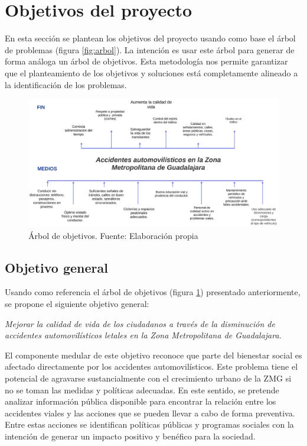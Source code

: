 \documentclass{article}
\newcommand{\forceindent}{\leavevmode{\parindent=1em\indent}}
\begin{document}
\newpage
\section{Objetivos del proyecto}\label{sec:objs}

En esta sección se plantean los objetivos del proyecto usando como base el
árbol de problemas (figura \ref{fig:arbol}). La intención es usar este árbol para generar
de forma análoga un árbol de objetivos. Esta metodología nos permite garantizar que
el planteamiento de los objetivos y soluciones está completamente alineado a la identificación
de los problemas. 

	\begin{figure}[H]\centering
	\includegraphics[width=1\textwidth]{resources/img/arbol_de_objetivos.png}
	\caption{\label{fig:arbol_obj} Árbol de objetivos. Fuente: Elaboración propia}
    \end{figure}


\subsection{Objetivo general}\label{subsec:general-objs}

Usando como referencia el árbol de objetivos (figura \ref{fig:arbol_obj}) presentado anteriormente, se propone el siguiente objetivo general:

\forceindent \textit{Mejorar la calidad de vida de los ciudadanos a través de la disminución de accidentes automovilísticos letales en la
Zona Metropolitana de Guadalajara.}

El componente medular de este objetivo reconoce que parte del bienestar social es afectado directamente por los accidentes automovilísticos. Este problema tiene el potencial de agravarse sustancialmente con el crecimiento urbano de la ZMG si no se toman las medidas y políticas adecuadas. En este sentido, se pretende analizar información pública disponible para encontrar la relación entre los accidentes viales y las acciones que se pueden llevar a cabo de forma preventiva. Entre estas acciones se identifican políticas públicas y programas sociales con la intención de generar un impacto positivo y benéfico para la sociedad. 
\end{document}
